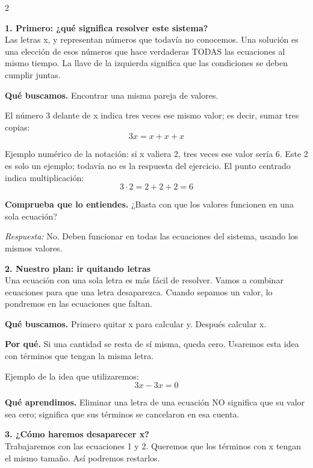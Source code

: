 \documentclass[11pt,a4paper,landscape]{article}
\begin{document}
\begin{multicols*}{2}
\noindent\begin{minipage}{\linewidth}\textbf{1. Primero: ¿qué significa resolver este sistema?}\\[2pt]Las letras x, y representan números que todavía no conocemos. Una solución es una elección de esos números que hace verdaderas TODAS las ecuaciones al mismo tiempo. La llave de la izquierda significa que las condiciones se deben cumplir juntas.
\par\smallskip\textbf{Qué buscamos.} Encontrar una misma pareja de valores.
\par\smallskip El número 3 delante de x indica tres veces ese mismo valor; es decir, sumar tres copias:
\[3x=x+x+x\]
\par\smallskip Ejemplo numérico de la notación: si x valiera 2, tres veces ese valor sería 6. Este 2 es solo un ejemplo; todavía no es la respuesta del ejercicio. El punto centrado indica multiplicación:
\[3\cdot 2=2+2+2=6\]
\par\smallskip\textbf{Comprueba que lo entiendes.} ¿Basta con que los valores funcionen en una sola ecuación?\par\textit{Respuesta:} No. Deben funcionar en todas las ecuaciones del sistema, usando los mismos valores.
\end{minipage}\par\medskip
\noindent\begin{minipage}{\linewidth}\textbf{2. Nuestro plan: ir quitando letras}\\[2pt]Una ecuación con una sola letra es más fácil de resolver. Vamos a combinar ecuaciones para que una letra desaparezca. Cuando sepamos un valor, lo pondremos en las ecuaciones que faltan.
\par\smallskip\textbf{Qué buscamos.} Primero quitar x para calcular y. Después calcular x.
\par\smallskip\textbf{Por qué.} Si una cantidad se resta de sí misma, queda cero. Usaremos esta idea con términos que tengan la misma letra.
\par\smallskip Ejemplo de la idea que utilizaremos:
\[3x-3x=0\]
\par\smallskip\textbf{Qué aprendimos.} Eliminar una letra de una ecuación NO significa que su valor sea cero; significa que sus términos se cancelaron en esa cuenta.
\end{minipage}\par\medskip
\noindent\begin{minipage}{\linewidth}\textbf{3. ¿Cómo haremos desaparecer x?}\\[2pt]Trabajaremos con las ecuaciones 1 y 2. Queremos que los términos con x tengan el mismo tamaño. Así podremos restarlos.

\end{minipage}
\end{multicols*}
\end{document}
